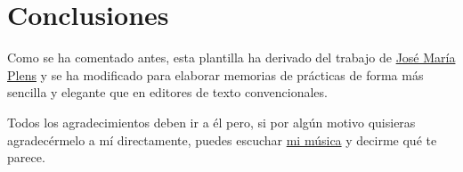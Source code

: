\section{Conclusiones}

Como se ha comentado antes, esta plantilla ha derivado del trabajo de \href{https://github.com/jmrplens/TFG-TFM_EPS}{José María Plens} y se ha modificado para elaborar memorias de prácticas de forma más sencilla y elegante que en editores de texto convencionales.

Todos los agradecimientos deben ir a él pero, si por algún motivo quisieras agradecérmelo a mí directamente, puedes escuchar \href{https://linktr.ee/westy_music}{mi música} y decirme qué te parece.
